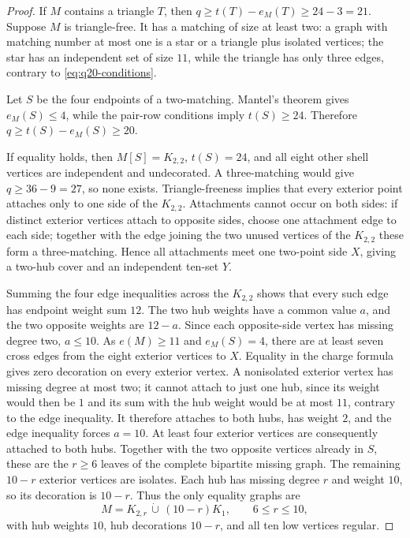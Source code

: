 \begin{proof}
If $M$ contains a triangle $T$, then $q\geq t(T)-e_M(T)\geq24-3=21$. Suppose $M$ is triangle-free. It has a matching of size at least two: a graph with matching number at most one is a star or a triangle plus isolated vertices; the star has an independent set of size $11$, while the triangle has only three edges, contrary to \eqref{eq:q20-conditions}.

Let $S$ be the four endpoints of a two-matching. Mantel's theorem gives $e_M(S)\leq4$, while the pair-row conditions imply $t(S)\geq24$. Therefore $q\geq t(S)-e_M(S)\geq20$.

If equality holds, then $M[S]=K_{2,2}$, $t(S)=24$, and all eight other shell vertices are independent and undecorated. A three-matching would give $q\geq36-9=27$, so none exists. Triangle-freeness implies that every exterior point attaches only to one side of the $K_{2,2}$. Attachments cannot occur on both sides: if distinct exterior vertices attach to opposite sides, choose one attachment edge to each side; together with the edge joining the two unused vertices of the $K_{2,2}$ these form a three-matching. Hence all attachments meet one two-point side $X$, giving a two-hub cover and an independent ten-set $Y$.

Summing the four edge inequalities across the $K_{2,2}$ shows that every such edge has endpoint weight sum $12$. The two hub weights have a common value $a$, and the two opposite weights are $12-a$. Since each opposite-side vertex has missing degree two, $a\leq10$. As $e(M)\geq11$ and $e_M(S)=4$, there are at least seven cross edges from the eight exterior vertices to $X$. Equality in the charge formula gives zero decoration on every exterior vertex. A nonisolated exterior vertex has missing degree at most two; it cannot attach to just one hub, since its weight would then be $1$ and its sum with the hub weight would be at most $11$, contrary to the edge inequality. It therefore attaches to both hubs, has weight $2$, and the edge inequality forces $a=10$. At least four exterior vertices are consequently attached to both hubs. Together with the two opposite vertices already in $S$, these are the $r\geq6$ leaves of the complete bipartite missing graph. The remaining $10-r$ exterior vertices are isolates. Each hub has missing degree $r$ and weight $10$, so its decoration is $10-r$. Thus the only equality graphs are
\[
M=K_{2,r}\,\dot\cup\,(10-r)K_1,\qquad 6\leq r\leq10,
\]
with hub weights $10$, hub decorations $10-r$, and all ten low vertices regular.
\end{proof}

